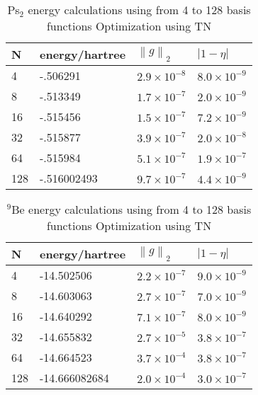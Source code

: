 \documentclass[12pt,thmsa]{article}
\begin{document}
\begin{table}[p] \centering%
\begin{tabular}{llll}
\hline\hline
N & energy/hartree & $\left\| g\right\| _2$ & $\left| 1-\eta \right| $ \\ 
\hline
4 & -.506291 & $2.9\times 10^{-8}$ & $8.0\times 10^{-9}$ \\ 
8 & -.513349 & $1.7\times 10^{-7}$ & $2.0\times 10^{-9}$ \\ 
16 & -.515456 & $1.5\times 10^{-7}$ & $7.2\times 10^{-9}$ \\ 
32 & -.515877 & $3.9\times 10^{-7}$ & $2.0\times 10^{-8}$ \\ 
64 & -.515984 & $5.1\times 10^{-7}$ & $1.9\times 10^{-7}$ \\ 
128 & -.516002493 & $9.7\times 10^{-7}$ & $4.4\times 10^{-9}$ \\ \hline\hline
\end{tabular}
\caption{Ps$_{2}$ energy calculations using from 4 to 128 basis functions
 Optimization using TN\label{Ps2eng}}%
\end{table}%

\begin{table}[p] \centering%
\begin{tabular}{llll}
\hline\hline
N & energy/hartree & $\left\| g\right\| _2$ & $\left| 1-\eta \right| $ \\ 
\hline
4 & -14.502506 & $2.2\times 10^{-7}$ & $9.0\times 10^{-9}$ \\ 
8 & -14.603063 & $2.7\times 10^{-7}$ & $7.0\times 10^{-9}$ \\ 
16 & -14.640292 & $7.1\times 10^{-7}$ & $8.0\times 10^{-9}$ \\ 
32 & -14.655832 & $2.7\times 10^{-5}$ & $3.8\times 10^{-7}$ \\ 
64 & -14.664523 & $3.7\times 10^{-4}$ & $3.8\times 10^{-7}$ \\ 
128 & -14.666082684 & $2.0\times 10^{-4}$ & $3.0\times 10^{-7}$ \\ 
\hline\hline
\end{tabular}
\caption{$ ^{9}$Be energy calculations using from 4 to 128 basis functions
 Optimization using TN\label{Be9eng}}%
\end{table}%
\end{document}
